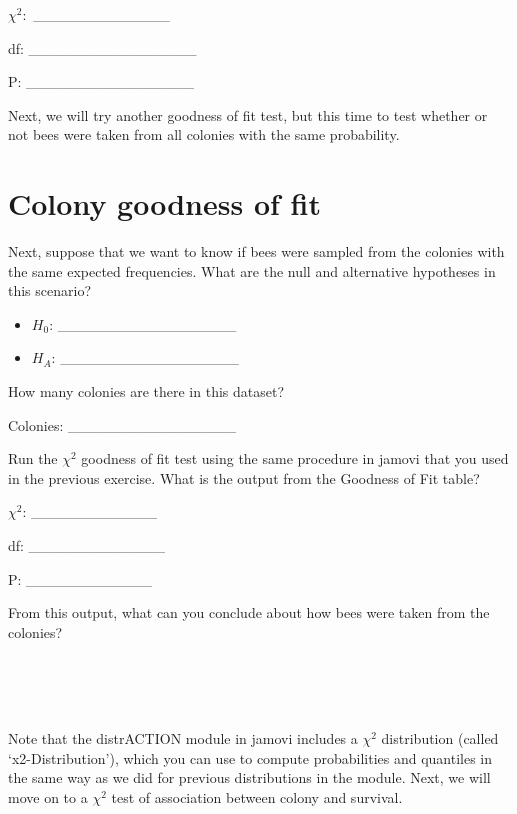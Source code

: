 \documentclass[
  openany]{scrbook}
\begin{document}
\(\chi^{2}:\) \_\_\_\_\_\_\_\_\_\_\_\_\_

df: \_\_\_\_\_\_\_\_\_\_\_\_\_\_\_\_

P: \_\_\_\_\_\_\_\_\_\_\_\_\_\_\_\_

Next, we will try another goodness of fit test, but this time to test whether or not bees were taken from all colonies with the same probability.

\hypertarget{colony-goodness-of-fit}{%
\section{Colony goodness of fit}\label{colony-goodness-of-fit}}

Next, suppose that we want to know if bees were sampled from the colonies with the same expected frequencies.
What are the null and alternative hypotheses in this scenario?

\begin{itemize}
\item
  \(H_{0}\): \_\_\_\_\_\_\_\_\_\_\_\_\_\_\_\_\_
\item
  \(H_{A}\): \_\_\_\_\_\_\_\_\_\_\_\_\_\_\_\_\_
\end{itemize}

How many colonies are there in this dataset?

Colonies: \_\_\_\_\_\_\_\_\_\_\_\_\_\_\_\_

Run the \(\chi^{2}\) goodness of fit test using the same procedure in jamovi that you used in the previous exercise.
What is the output from the Goodness of Fit table?

\(\chi^{2}\): \_\_\_\_\_\_\_\_\_\_\_\_

df: \_\_\_\_\_\_\_\_\_\_\_\_\_

P: \_\_\_\_\_\_\_\_\_\_\_\_

From this output, what can you conclude about how bees were taken from the colonies?

\begin{verbatim}




\end{verbatim}

Note that the distrACTION module in jamovi includes a \(\chi^{2}\) distribution (called `x2-Distribution'), which you can use to compute probabilities and quantiles in the same way as we did for previous distributions in the module.
Next, we will move on to a \(\chi^{2}\) test of association between colony and survival.
\end{document}
